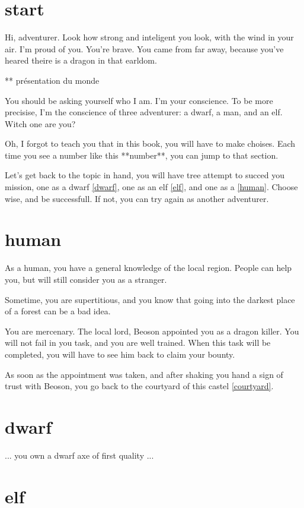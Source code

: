 \section{start}

Hi, adventurer. Look how strong and inteligent you look, with the wind in your
air. I'm proud of you. You're brave. You came from far away, because you've
heared theire is a dragon in that earldom.

** présentation du monde

You should be asking yourself who I am. I'm your conscience. To be more
precisise, I'm the conscience of three adventurer: a dwarf, a man, and an elf.
Witch one are you?

Oh, I forgot to teach you that in this book, you will have to make choises. Each
time you see a number like this **number**, you can jump to that section.

Let's get back to the topic in hand, you will have tree attempt to succed you
mission, one as a dwarf \ref{dwarf}, one as an elf \ref{elf}, and one as a
\ref{human}. Choose wise, and be successfull. If not, you can try again as
another adventurer.

\section{human}

As a human, you have a general knowledge of the local region. People can help
you, but will still consider you as a stranger.

Sometime, you are supertitious, and you know that going into the darkest place
of a forest can be a bad idea.

You are mercenary. The local lord, Beoson appointed you as a dragon killer. You
will not fail in you task, and you are well trained. When this task will be
completed, you will have to see him back to claim your bounty.

As soon as the appointment was taken, and after shaking you hand a sign of trust
with Beoson, you go back to the courtyard of this castel \ref{courtyard}.

\section{dwarf}

... you own a dwarf axe of first quality ...

\section{elf}
